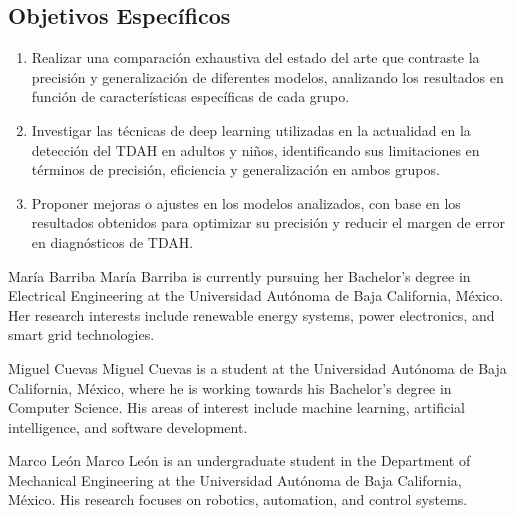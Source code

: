 \documentclass[10pt,journal,compsoc]{IEEEtran}
\begin{document}
\subsection{Objetivos Específicos}
\begin{enumerate}
    \item Realizar una comparación exhaustiva del estado del arte que contraste la precisión y generalización de diferentes modelos, analizando los resultados en función de características específicas de cada grupo.
    \item Investigar las técnicas de deep learning utilizadas en la actualidad en la detección del TDAH en adultos y niños, identificando sus limitaciones en términos de precisión, eficiencia y generalización en ambos grupos.
    \item Proponer mejoras o ajustes en los modelos analizados, con base en los resultados obtenidos para optimizar su precisión y reducir el margen de error en diagnósticos de TDAH.
\end{enumerate}

\printbibliography

\begin{IEEEbiography}{María Barriba}
    María Barriba is currently pursuing her Bachelor's degree in Electrical Engineering at the Universidad Autónoma de Baja California, México. Her research interests include renewable energy systems, power electronics, and smart grid technologies.
\end{IEEEbiography}

\begin{IEEEbiography}{Miguel Cuevas}
    Miguel Cuevas is a student at the Universidad Autónoma de Baja California, México, where he is working towards his Bachelor's degree in Computer Science. His areas of interest include machine learning, artificial intelligence, and software development.
\end{IEEEbiography}

\begin{IEEEbiography}{Marco León}
    Marco León is an undergraduate student in the Department of Mechanical Engineering at the Universidad Autónoma de Baja California, México. His research focuses on robotics, automation, and control systems.
\end{IEEEbiography}
\end{document}
